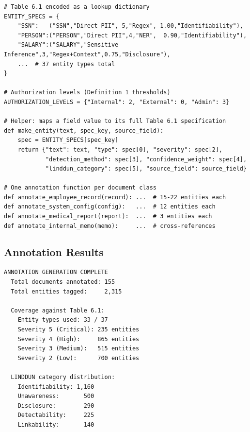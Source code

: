 \documentclass[12pt, a4paper]{article}
\begin{document}
\begin{lstlisting}[caption={Core structure of the annotation pipeline (simplified).}]
# Table 6.1 encoded as a lookup dictionary
ENTITY_SPECS = {
    "SSN":   ("SSN","Direct PII", 5,"Regex", 1.00,"Identifiability"),
    "PERSON":("PERSON","Direct PII",4,"NER",  0.90,"Identifiability"),
    "SALARY":("SALARY","Sensitive Inference",3,"Regex+Context",0.75,"Disclosure"),
    ...  # 37 entity types total
}

# Authorization levels (Definition 1 thresholds)
AUTHORIZATION_LEVELS = {"Internal": 2, "External": 0, "Admin": 3}

# Helper: maps a field value to its full Table 6.1 specification
def make_entity(text, spec_key, source_field):
    spec = ENTITY_SPECS[spec_key]
    return {"text": text, "type": spec[0], "severity": spec[2],
            "detection_method": spec[3], "confidence_weight": spec[4],
            "linddun_category": spec[5], "source_field": source_field}

# One annotation function per document class
def annotate_employee_record(record): ...  # 15-22 entities each
def annotate_system_config(config):   ...  # 12 entities each
def annotate_medical_report(report):  ...  # 3 entities each
def annotate_internal_memo(memo):     ...  # cross-references
\end{lstlisting}

\subsection{Annotation Results}

\begin{resultbox}
\begin{lstlisting}[style=termstyle]
ANNOTATION GENERATION COMPLETE
  Total documents annotated: 155
  Total entities tagged:     2,315

  Coverage against Table 6.1:
    Entity types used: 33 / 37
    Severity 5 (Critical): 235 entities
    Severity 4 (High):     865 entities
    Severity 3 (Medium):   515 entities
    Severity 2 (Low):      700 entities

  LINDDUN category distribution:
    Identifiability: 1,160
    Unawareness:       500
    Disclosure:        290
    Detectability:     225
    Linkability:       140
\end{lstlisting}
\end{resultbox}
\end{document}
